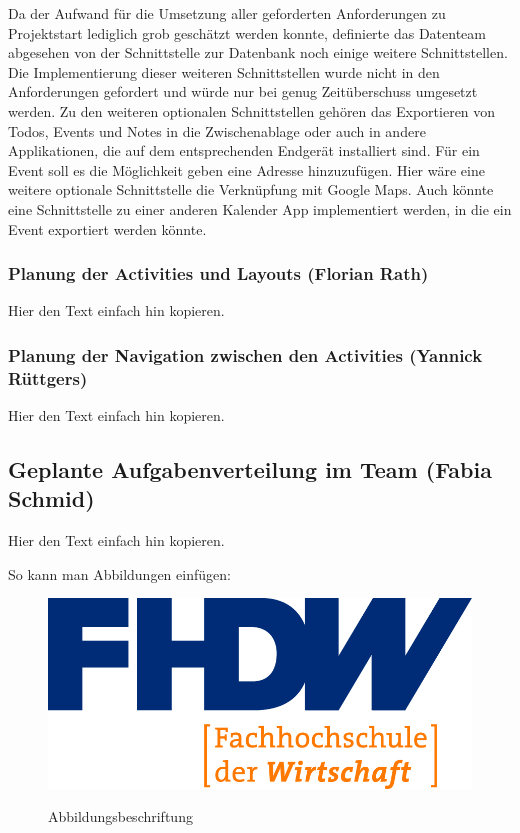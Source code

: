 Da der Aufwand für die Umsetzung aller geforderten Anforderungen zu Projektstart lediglich grob geschätzt werden konnte, definierte das Datenteam abgesehen von der Schnittstelle zur Datenbank noch einige weitere Schnittstellen. Die Implementierung dieser weiteren Schnittstellen wurde nicht in den Anforderungen gefordert und würde nur bei genug Zeitüberschuss umgesetzt werden. Zu den weiteren optionalen Schnittstellen gehören das Exportieren von Todos, Events und Notes in die Zwischenablage oder auch in andere Applikationen, die auf dem entsprechenden Endgerät installiert sind. Für ein Event soll es die Möglichkeit geben eine Adresse hinzuzufügen. Hier wäre eine weitere optionale Schnittstelle die Verknüpfung mit Google Maps. Auch könnte eine Schnittstelle zu einer anderen Kalender App implementiert werden, in die ein Event exportiert werden könnte.

\newpage

\subsubsection{Planung der Activities und Layouts (Florian Rath)}

Hier den Text einfach hin kopieren.

\subsubsection{Planung der Navigation zwischen den Activities (Yannick Rüttgers)}

Hier den Text einfach hin kopieren.

\subsection{Geplante Aufgabenverteilung im Team (Fabia Schmid)}

Hier den Text einfach hin kopieren.


So kann man Abbildungen einfügen:

\begin{figure}[H]
\centering
\begin{minipage}[t]{1\textwidth} %
\caption{Abbildungsbeschriftung} %
\includegraphics[width=1\textwidth]{img/fhdw}\\ %
\end{minipage}
\end{figure}

